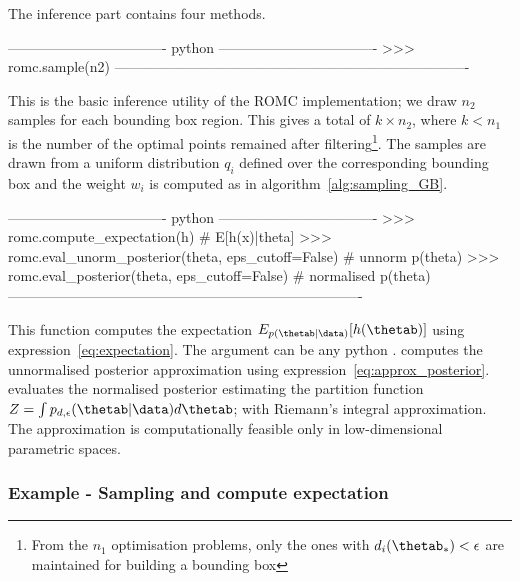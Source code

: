 The inference part contains four methods.

\begin{Code}
---------------------------------- python ----------------------------------
>>> romc.sample(n2)
----------------------------------------------------------------------------
\end{Code}

\noindent
This is the basic inference utility of the ROMC implementation; we
draw $n_2$ samples for each bounding box region. This gives a total of
$k \times n_2$, where $k < n_1$ is the number of the optimal points
remained after filtering\footnote{From the $n_1$ optimisation
  problems, only the ones with $d_i(\thetab_*) < \epsilon$ are
  maintained for building a bounding box}. The samples are drawn from
a uniform distribution $q_i$ defined over the corresponding bounding
box and the weight $w_i$ is computed as in
algorithm~\ref{alg:sampling_GB}.

\begin{Code}
---------------------------------- python ----------------------------------
>>> romc.compute_expectation(h) # E[h(x)|theta]
>>> romc.eval_unorm_posterior(theta, eps_cutoff=False) # unnorm p(theta)
>>> romc.eval_posterior(theta, eps_cutoff=False) # normalised p(theta)
----------------------------------------------------------------------------
\end{Code}

\noindent
This function computes the expectation
$E_{p(\thetab|\data)}[h(\thetab)]$ using
expression~\eqref{eq:expectation}. The argument  can be any
python .  computes the
unnormalised posterior approximation using
expression~\eqref{eq:approx_posterior}. 
evaluates the normalised posterior estimating the partition function
$Z = \int p_{d,\epsilon}(\thetab|\data)d\thetab$; with Riemann's
integral approximation. The approximation is computationally feasible
only in low-dimensional parametric spaces.

\subsubsection*{Example - Sampling and compute expectation}

